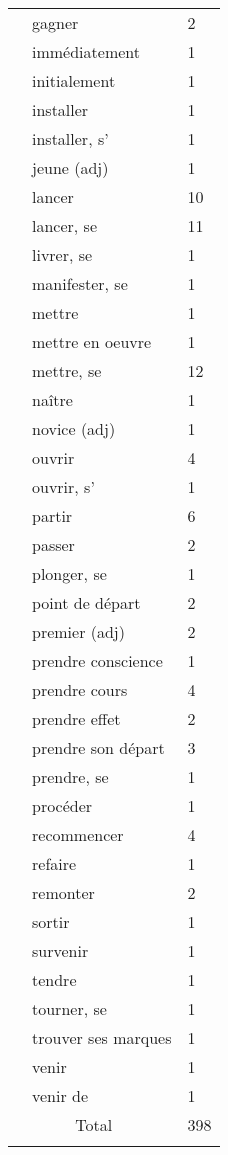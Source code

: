 \begin{tabularx}{\textwidth}{XXX}
& gagner &  2\\
& immédiatement &  1\\
& initialement &  1\\
& installer &  1\\
& installer, s' &  1\\
& jeune (adj) &  1\\
& lancer &  10\\
& lancer, se &  11\\
& livrer, se &  1\\
& manifester, se &  1\\
& mettre &  1\\
& mettre en oeuvre &  1\\
& mettre, se &  12\\
& naître &  1\\
& novice (adj) &  1\\
& ouvrir &  4\\
& ouvrir, s' &  1\\
& partir &  6\\
& passer &  2\\
& plonger, se &  1\\
& point de départ &  2\\
& premier (adj) &  2\\
& prendre conscience &  1\\
& prendre cours &  4\\
& prendre effet &  2\\
& prendre son départ &  3\\
& prendre, se &  1\\
& procéder &  1\\
& recommencer &  4\\
& refaire &  1\\
& remonter &  2\\
& sortir &  1\\
& survenir &  1\\
& tendre &  1\\
& tourner, se &  1\\
& trouver ses marques &  1\\
& venir &  1\\
& venir de &  1\\
\multicolumn{2}{c}{Total} &  398\\
\lspbottomrule
\end{tabularx}



